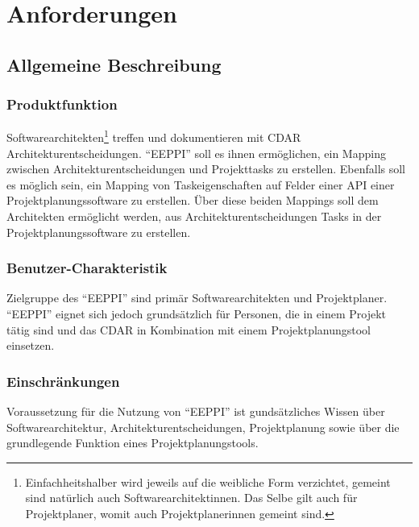 \chapter{Anforderungen}
\section{Allgemeine Beschreibung}

\subsection{Produktfunktion}
Softwarearchitekten\footnote{Einfachheitshalber wird jeweils auf die weibliche Form verzichtet, gemeint sind natürlich auch Softwarearchitektinnen. Das Selbe gilt auch für Projektplaner, womit auch Projektplanerinnen gemeint sind.} treffen und dokumentieren mit CDAR Architekturentscheidungen.
"`EEPPI"' soll es ihnen ermöglichen, ein Mapping zwischen Architekturentscheidungen und Projekttasks zu erstellen.
Ebenfalls soll es möglich sein, ein Mapping von Taskeigenschaften auf Felder einer API einer Projektplanungssoftware zu erstellen.
Über diese beiden Mappings soll dem Architekten ermöglicht werden, aus Architekturentscheidungen Tasks in der Projektplanungssoftware zu erstellen.

\subsection{Benutzer-Charakteristik}
Zielgruppe des "`EEPPI"' sind primär Softwarearchitekten und Projektplaner. "`EEPPI"' eignet sich jedoch grundsätzlich für Personen, die in einem Projekt tätig sind und das CDAR in Kombination mit einem Projektplanungstool einsetzen.

\subsection{Einschränkungen}
Voraussetzung für die Nutzung von "`EEPPI"' ist gundsätzliches Wissen über Softwarearchitektur, Architekturentscheidungen, Projektplanung sowie über die grundlegende Funktion eines Projektplanungstools.

